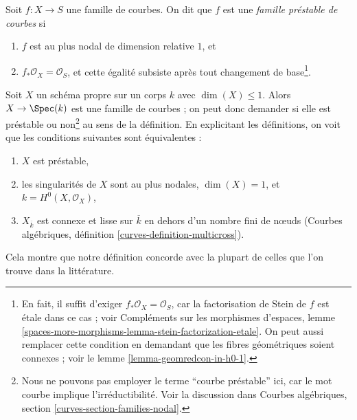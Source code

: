 \begin{definition}
\label{definition-prestable}
Soit $f : X \to S$ une famille de courbes. On dit que $f$ est une
{\it famille préstable de courbes} si
\begin{enumerate}
\item $f$ est au plus nodal de dimension relative $1$, et
\item $f_*\mathcal{O}_X = \mathcal{O}_S$, et cette égalité subsiste après
tout changement de base\footnote{En fait, il suffit d'exiger
$f_*\mathcal{O}_X = \mathcal{O}_S$, car la factorisation de Stein
de $f$ est étale dans ce cas ; voir
Compléments sur les morphismes d'espaces, lemme
\ref{spaces-more-morphisms-lemma-stein-factorization-etale}.
On peut aussi remplacer cette condition en demandant que les fibres
géométriques soient connexes ; voir le lemme \ref{lemma-geomredcon-in-h0-1}.}.
\end{enumerate}
\end{definition}

\noindent
Soit $X$ un schéma propre sur un corps $k$ avec $\dim(X) \leq 1$.
Alors $X \to \Spec(k)$ est une famille de courbes ; on peut donc demander
si elle est préstable ou non\footnote{Nous ne pouvons pas employer le terme
``courbe préstable'' ici, car le mot courbe implique l'irréductibilité. Voir
la discussion dans Courbes algébriques, section \ref{curves-section-families-nodal}.}
au sens de la définition. En explicitant les définitions, on voit que
les conditions suivantes sont équivalentes :
\begin{enumerate}
\item $X$ est préstable,
\item les singularités de $X$ sont au plus nodales, $\dim(X) = 1$,
et $k = H^0(X, \mathcal{O}_X)$,
\item $X_{\overline{k}}$ est connexe et lisse sur $\overline{k}$
en dehors d'un nombre fini de nœuds
(Courbes algébriques, définition \ref{curves-definition-multicross}).
\end{enumerate}
Cela montre que notre définition concorde avec la plupart de celles que l'on trouve
dans la littérature.

